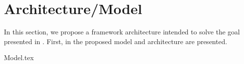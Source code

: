 \chapter{Architecture/Model}
\label{section:Architecture}

In this section, we propose a framework architecture intended to solve the goal presented in .
First, in  the proposed model and architecture are presented.


{Model.tex}

